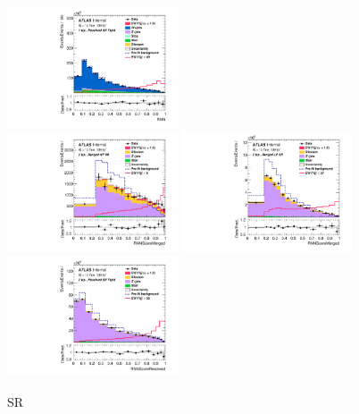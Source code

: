 \begin{figure}[H]
    \includegraphics[width=0.45\textwidth]{figures/PostFit/Region_distRNN_DSRVBSTight_BMin0_T0_Y6051_incTag1_J2_L1_incJet1_GlobalFit_unconditionnal_mu1}
    \\
    \includegraphics[width=0.45\textwidth]{figures/PostFit/Region_distRNNScoreMerged_DSRVBSHP_BMin0_J0_incJet1_L2_T0_incFat1_Y6051_incTag1_Fat1_GlobalFit_unconditionnal_mu1}
    \includegraphics[width=0.45\textwidth]{figures/PostFit/Region_distRNNScoreMerged_DSRVBSLP_BMin0_J0_incJet1_L2_T0_incFat1_Y6051_incTag1_Fat1_GlobalFit_unconditionnal_mu1}
    \\
    \includegraphics[width=0.45\textwidth]{figures/PostFit/Region_distRNNScoreResolved_DSRVBSFid_BMin0_T0_Y6051_incTag1_J2_L2_incJet1_GlobalFit_unconditionnal_mu1}
    \caption{SR}
    \label{fig:postSR}
\end{figure}

